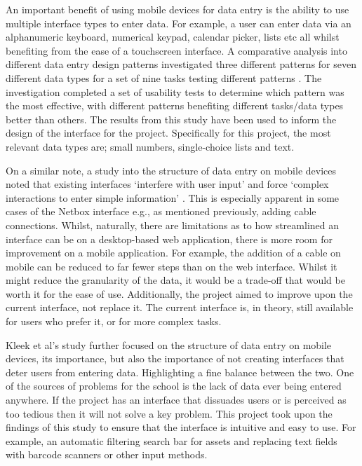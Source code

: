 \documentclass [11pt,a4paper]{article}
\begin{document}
An important benefit of using mobile devices for data entry is the ability to use multiple interface types to enter data. For example, a user can enter data via an alphanumeric keyboard, numerical keypad, calendar picker, lists etc all whilst benefiting from the ease of a touchscreen interface. A comparative analysis into different data entry design patterns investigated three different patterns for seven different data types for a set of nine tasks testing different patterns \cite{myka2019comparative}. The investigation completed a set of usability tests to determine which pattern was the most effective, with different patterns benefiting different tasks/data types better than others. The results from this study have been used to inform the design of the interface for the project. Specifically for this project, the most relevant data types are; small numbers, single-choice lists and text.

On a similar note, a study into the structure of data entry on mobile devices noted that existing interfaces `interfere with user input' and force `complex interactions to enter simple information' \cite{van2007gui}. This is especially apparent in some cases of the Netbox interface e.g., as mentioned previously, adding cable connections. Whilst, naturally, there are limitations as to how streamlined an interface can be on a desktop-based web application, there is more room for improvement on a mobile application. For example, the addition of a cable on mobile can be reduced to far fewer steps than on the web interface. Whilst it might reduce the granularity of the data, it would be a trade-off that would be worth it for the ease of use. Additionally, the project aimed to improve upon the current interface, not replace it. The current interface is, in theory, still available for users who prefer it, or for more complex tasks.

Kleek et al's \cite{van2007gui} study further focused on the structure of data entry on mobile devices, its importance, but also the importance of not creating interfaces that deter users from entering data. Highlighting a fine balance between the two. One of the sources of problems for the school is the lack of data ever being entered anywhere. If the project has an interface that dissuades users or is perceived as too tedious then it will not solve a key problem. This project took upon the findings of this study to ensure that the interface is intuitive and easy to use. For example, an automatic filtering search bar for assets and replacing text fields with barcode scanners or other input methods.
\end{document}

